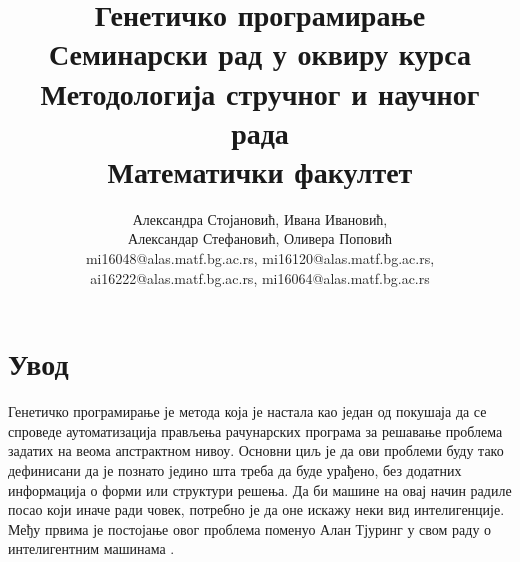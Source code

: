 \documentclass[a4paper]{article}
\begin{document}
\title{Генетичко програмирање\\ \small{Семинарски рад у оквиру курса\\Методологија стручног и научног рада\\ Математички факултет}}

\author{Александра Стојановић, Ивана Ивановић,\\ Александар Стефановић, Оливера Поповић\\ mi16048@alas.matf.bg.ac.rs, mi16120@alas.matf.bg.ac.rs,\\ ai16222@alas.matf.bg.ac.rs, mi16064@alas.matf.bg.ac.rs}


\maketitle


\tableofcontents

\newpage

\section{Увод}

Генетичко програмирање је метода која је настала као један од покушаја да се спроведе аутоматизација прављења рачунарских програма за решавање проблема задатих на веома апстрактном нивоу. Основни циљ је да ови проблеми буду тако дефинисани да је познато једино шта треба да буде урађено, без додатних информација о форми или структури решења. Да би машине на овај начин радиле посао који иначе ради човек, потребно је да оне искажу неки вид интелигенције. Међу првима је постојање овог проблема поменуо Алан Тјуринг у свом раду о интелигентним машинама \cite{turing}.
\end{document}
